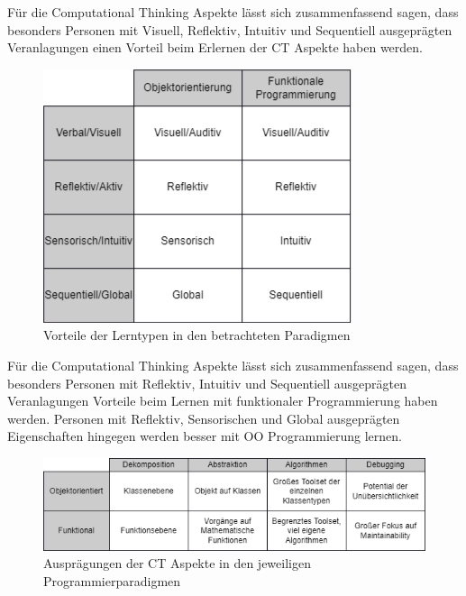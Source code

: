 Für die Computational Thinking Aspekte lässt sich zusammenfassend sagen, dass besonders Personen mit Visuell, Reflektiv, Intuitiv und Sequentiell ausgeprägten Veranlagungen einen Vorteil beim Erlernen der CT Aspekte haben werden.

\begin{figure}[H]
    \centering
    \includegraphics[width=1\linewidth]{Figures/Section_3/Styles_Paradigms}
    \caption{Vorteile der Lerntypen in den betrachteten Paradigmen}
\end{figure}

Für die Computational Thinking Aspekte lässt sich zusammenfassend sagen, dass besonders Personen mit Reflektiv, Intuitiv und Sequentiell ausgeprägten Veranlagungen Vorteile beim Lernen mit funktionaler Programmierung haben werden.
Personen mit Reflektiv, Sensorischen und Global ausgeprägten Eigenschaften hingegen werden besser mit OO Programmierung lernen.

\begin{figure}[H]
    \centering
    \includegraphics[width=1\linewidth]{Figures/Section_3/CT_Paradigms}
    \caption{Ausprägungen der CT Aspekte in den jeweiligen Programmierparadigmen}
\end{figure}

